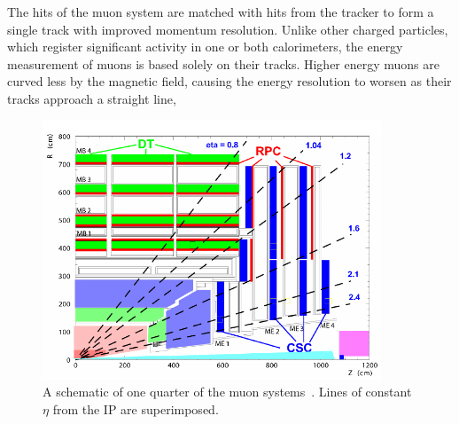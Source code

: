 The hits of the muon system are matched with hits from the tracker to form a single track with
improved momentum resolution. Unlike other charged particles, which register significant activity in
one or both calorimeters, the energy measurement of muons is based solely on their tracks.
Higher energy muons are curved less by the magnetic field,
causing the energy resolution to worsen as their tracks approach a straight line,



\begin{figure}[htbp!]
 \begin{center}
   \includegraphics[width=0.90\textwidth]{figures/experiment/muons.pdf}
      \end{center}
\caption{A schematic of one quarter of the muon systems~\cite{Chatrchyan:2008zzk}.
Lines of constant $\eta$ from the IP are superimposed.}
\label{fig:muonsystem}
\end{figure}


